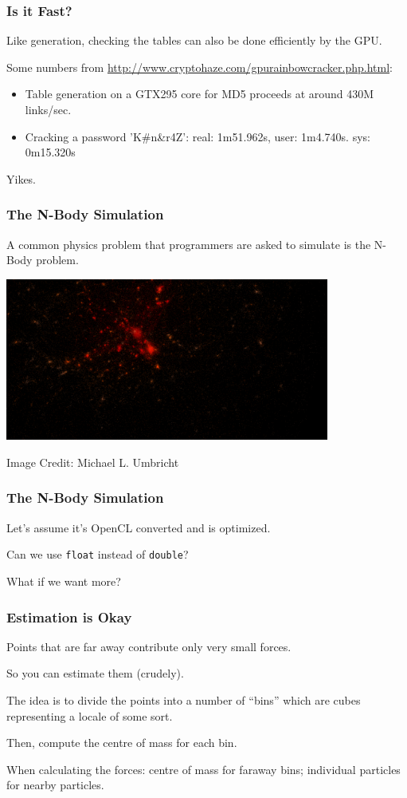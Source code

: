 \begin{frame}
\frametitle{Is it Fast?}

Like generation, checking the tables can also be done efficiently by the GPU.

Some numbers from \url{http://www.cryptohaze.com/gpurainbowcracker.php.html}: 

\begin{itemize}
	\item Table generation on a GTX295 core for MD5 proceeds at around 430M links/sec.
	\item Cracking a password 'K\#n\&r4Z': real: 1m51.962s, user: 1m4.740s. sys: 0m15.320s
\end{itemize}

Yikes.

\end{frame}



\begin{frame}
\frametitle{The N-Body Simulation}

A common physics problem that programmers are asked to simulate is the N-Body problem.

\begin{center}
\includegraphics[width=0.8\textwidth]{images/Galaxy_Cluster_sim.png}
\end{center}
\hfill Image Credit: Michael L. Umbricht 


\end{frame}


\begin{frame}
\frametitle{The N-Body Simulation}

Let's assume it's OpenCL converted and is optimized.

Can we use \texttt{float} instead of \texttt{double}?

What if we want more?

\end{frame}


\begin{frame}
\frametitle{Estimation is Okay}

Points that are far away contribute only very small forces. 

So you can estimate them (crudely). 

The idea is to divide the points into a number of ``bins'' which are cubes representing a locale of some sort. 

Then, compute the centre of mass for each bin. 

When calculating the forces: centre of mass for faraway bins; individual particles for nearby particles.


\end{frame}


